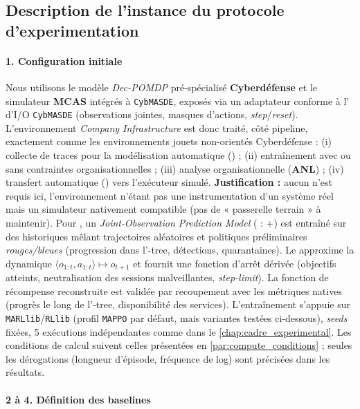 \subsection{Description de l'instance du protocole d'experimentation}

\paragraph{1. Configuration initiale}

Nous utilisons le modèle \emph{Dec-POMDP} pré-spécialisé \textbf{Cyberdéfense} et le simulateur \textbf{MCAS} intégrés à \texttt{CybMASDE}, exposés via un adaptateur  conforme à l' d'I/O \texttt{CybMASDE} (observations jointes, masques d'actions, \emph{step}/\emph{reset}). L'environnement \emph{Company Infrastructure} est donc traité, côté pipeline, exactement comme les environnements jouets non-orientés Cyberdéfense : (i) collecte de traces pour la modélisation automatique (\texttt{}) ; (ii) entraînement  avec ou sans contraintes organisationnelles ; (iii) analyse organisationnelle (\textbf{ANL}) ; (iv) transfert automatique (\texttt{}) vers l'exécuteur simulé.
\textbf{Justification :} aucun \texttt{} n'est requis ici, l'environnement n'étant pas une instrumentation d'un système réel mais un simulateur nativement compatible (pas de « passerelle terrain » à maintenir).
Pour \texttt{}, un \emph{Joint-Observation Prediction Model} ( : +) est entraîné sur des historiques mêlant trajectoires aléatoires et politiques préliminaires \emph{rouges/bleues} (progression dans l'-tree, détections, quarantaines). Le  approxime la dynamique $\langle o_{1:t},a_{1:t} \rangle \mapsto o_{t+1}$ et fournit une fonction d'arrêt dérivée (objectifs atteints, neutralisation des sessions malveillantes, \emph{step-limit}). La fonction de récompense reconstruite est validée par recoupement avec les métriques natives (progrès le long de l'-tree, disponibilité des services). L'entraînement s'appuie sur \texttt{MARLlib}/\texttt{RLlib} (profil \texttt{MAPPO} par défaut, mais variantes testées ci-dessous), \emph{seeds} fixées, 5 exécutions indépendantes comme dans le \autoref{chap:cadre_experimental}. Les conditions de calcul suivent celles présentées en \autoref{par:compute_conditions} ; seules les dérogations (longueur d'épisode, fréquence de log) sont précisées dans les résultats.

\paragraph{2 à 4. Définition des baselines}

